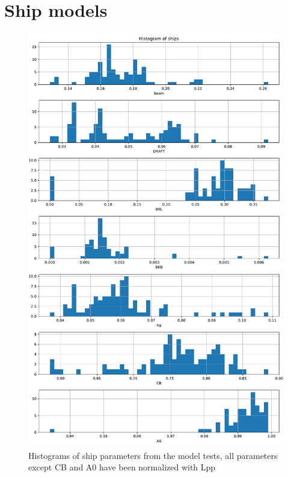 \section{Ship models}\label{app:ships}
\begin{figure}[H]
    \centering
    \includegraphics[width=0.7\columnwidth]{figures/ship_parameters.pdf}
    \caption{Histograms of ship parameters from the model tests, all parameters except CB and A0 have been normalized with Lpp}
    \label{fig:ship_parameters}
\end{figure}